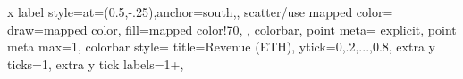 x label style={at={(0.5,-.25)},anchor=south,}, scatter/use mapped color={
            draw=mapped color,
            fill=mapped color!70,
        }, colorbar, point meta= explicit, point meta max=1,
    colorbar style={
        title={Revenue (ETH)},
        ytick={0,.2,...,0.8}, extra y ticks={1},
        extra y tick labels={1+}},
